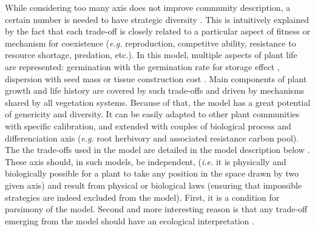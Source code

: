 While considering too many axis does not improve community description, a certain number is needed to have strategic diversity \cite{laughlin_intrinsic_2014}. This is intuitively explained by the fact that each trade-off is closely related to a particular aspect of fitness or mechanism for coexistence (\textit{e.g.} reproduction, competitve ability, resistance to resource shortage, predation, etc.). In this model, multiple aspects of plant life are represented: germination with the germination rate for storage effect \cite{chesson_general_2000, adler_climate_2006}, dispersion with seed mass \cite{westoby_leaf-height-seed_1998} or tissue construction cost \cite{reich_leaf_1992, wright_worldwide_2004, reich_world-wide_2014}. Main components of plant growth and life history are covered by such trade-offs and driven by mechanisms shared by all vegetation systems. Because of that, the model has a great potential of genericity and diversity. It can be easily adapted to other plant communities with specific calibration, and extended with couples of biological process and differenciation axis (\textit{e.g.} root herbivory and associated resistance carbon pool). The the trade-offs used in the model are detailed in the model description below . These axis should, in such models, be independent, (\textit{i.e.} it is physically and biologically possible for a plant to take any position in the space drawn by two given axis) and result from physical or biological laws (ensuring that impossible strategies are indeed excluded from the model). First, it is a condition for parsimony of the model. Second and more interesting reason is that any trade-off emerging from the model should have an ecological interpretation \cite{maire_disentangling_2013}. \\
 

